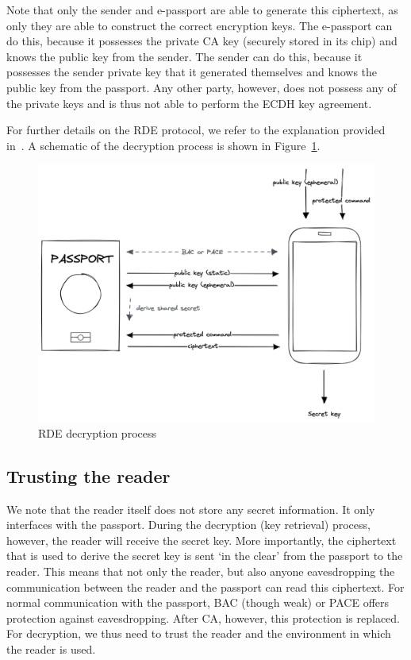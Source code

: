Note that only the sender and e-passport are able to generate this ciphertext, as only they are able to construct the correct encryption keys.
The e-passport can do this, because it possesses the private CA key (securely stored in its chip) and knows the public key from the sender.
The sender can do this, because it possesses the sender private key that it generated themselves and knows the public key from the passport.
Any other party, however, does not possess any of the private keys and is thus not able to perform the ECDH key agreement.

For further details on the RDE protocol, we refer to the explanation provided in~\cite{verheul2017remote}.
A schematic of the decryption process is shown in Figure~\ref{fig:rde-decryption}.
\begin{figure}
    \centering
    \includegraphics[width=0.8\linewidth]{imgs/RDE decryption}
    \caption{RDE decryption process}
    \label{fig:rde-decryption}
\end{figure}

\subsection{Trusting the reader}\label{subsec:trusting-the-reader}
We note that the reader itself does not store any secret information.
It only interfaces with the passport.
During the decryption (key retrieval) process, however, the reader will receive the secret key.
More importantly, the ciphertext that is used to derive the secret key is sent `in the clear' from the passport to the reader.
This means that not only the reader, but also anyone eavesdropping the communication between the reader and the passport can read this ciphertext.
For normal communication with the passport, BAC (though weak) or PACE offers protection against eavesdropping.
After CA, however, this protection is replaced.
For decryption, we thus need to trust the reader and the environment in which the reader is used.

